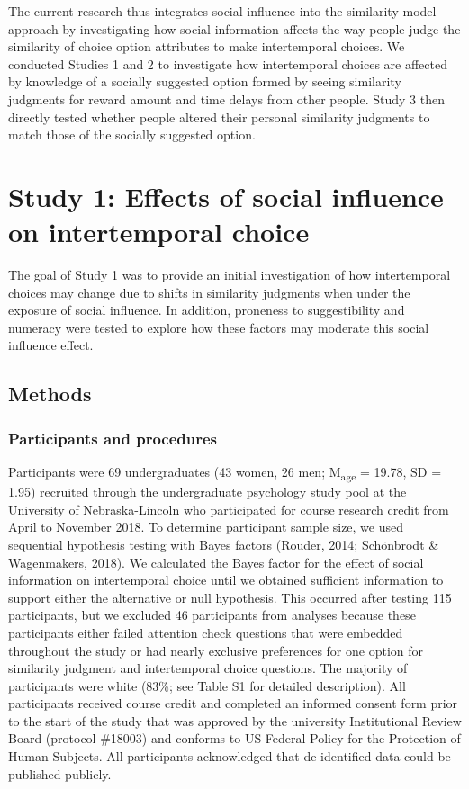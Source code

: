 \documentclass[
  pub,floatsintext]{apa6}
\begin{document}
The current research thus integrates social influence into the similarity model approach by investigating how social information affects the way people judge the similarity of choice option attributes to make intertemporal choices. We conducted Studies 1 and 2 to investigate how intertemporal choices are affected by knowledge of a socially suggested option formed by seeing similarity judgments for reward amount and time delays from other people. Study 3 then directly tested whether people altered their personal similarity judgments to match those of the socially suggested option.

\hypertarget{study-1-effects-of-social-influence-on-intertemporal-choice}{%
\section{Study 1: Effects of social influence on intertemporal choice}\label{study-1-effects-of-social-influence-on-intertemporal-choice}}

The goal of Study 1 was to provide an initial investigation of how intertemporal choices may change due to shifts in similarity judgments when under the exposure of social influence. In addition, proneness to suggestibility and numeracy were tested to explore how these factors may moderate this social influence effect.

\hypertarget{methods}{%
\subsection{Methods}\label{methods}}

\hypertarget{participants-and-procedures}{%
\subsubsection{Participants and procedures}\label{participants-and-procedures}}

Participants were 69 undergraduates (43 women, 26 men; M\textsubscript{age} = 19.78, SD = 1.95) recruited through the undergraduate psychology study pool at the University of Nebraska-Lincoln who participated for course research credit from April to November 2018. To determine participant sample size, we used sequential hypothesis testing with Bayes factors (Rouder, 2014; Schönbrodt \& Wagenmakers, 2018). We calculated the Bayes factor for the effect of social information on intertemporal choice until we obtained sufficient information to support either the alternative or null hypothesis. This occurred after testing 115 participants, but we excluded 46 participants from analyses because these participants either failed attention check questions that were embedded throughout the study or had nearly exclusive preferences for one option for similarity judgment and intertemporal choice questions. The majority of participants were white (83\%; see Table S1 for detailed description). All participants received course credit and completed an informed consent form prior to the start of the study that was approved by the university Institutional Review Board (protocol \#18003) and conforms to US Federal Policy for the Protection of Human Subjects. All participants acknowledged that de-identified data could be published publicly.
\end{document}
